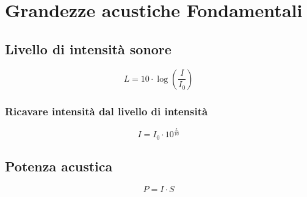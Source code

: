 \documentclass{book}
\begin{document}
\section{Grandezze acustiche Fondamentali}
\label{sec:granacustiche}

\subsection{Livello di intensità sonore}
\label{sec:livintson}

\begin{equation}
  \label{eq:livintson}
  L=10\cdot\log \left(\frac{I}{I_0}\right)
\end{equation}

\subsubsection{Ricavare intensità dal livello di intensità}
\label{sec:ricintdallint}

\begin{equation}
  \label{eq:ricintdallint}
  I=I_0\cdot 10^{\frac{L}{10}}
\end{equation}
\subsection{Potenza acustica}
\label{sec:potacust}

\begin{equation}
  \label{eq:potacust}
  P=I\cdot S
\end{equation}
\end{document}
